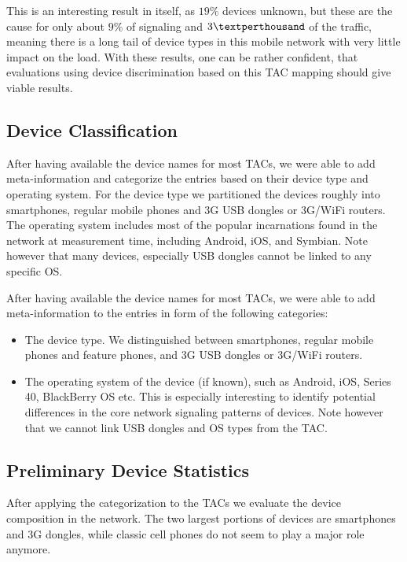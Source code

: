 This is an interesting result in itself, as $19\%$ devices unknown, but these are the cause for only about $9\%$ of signaling and $3\textperthousand$ of the traffic, meaning there is a long tail of device types in this mobile network with very little impact on the load. With these results, one can be rather confident, that evaluations using device discrimination based on this \gls{TAC} mapping should give viable results.


\subsection{Device Classification}

After having available the device names for most \glspl{TAC}, we were able to add meta-information and categorize the entries based on their device type and operating system. For the device type we partitioned the devices roughly into smartphones, regular mobile phones and 3G USB dongles or 3G/WiFi routers. The operating system includes most of the popular incarnations found in the network at measurement time, including Android, iOS, and Symbian. Note however that many devices, especially USB dongles cannot be linked to any specific OS.


After having available the device names for most \glspl{TAC}, we were able to add meta-information to the entries in form of the following categories:

\begin{itemize}
\item The device type. We distinguished between smartphones, regular mobile phones and feature phones, and 3G USB dongles or 3G/WiFi routers.

\item The operating system of the device (if known), such as Android, iOS, Series 40, BlackBerry OS etc. This is especially interesting to identify potential differences in the core network signaling patterns of devices. Note however that we cannot link USB dongles and OS types from the \gls{TAC}.

\end{itemize}



\subsection{Preliminary Device Statistics}
After applying the categorization to the \glspl{TAC} we evaluate the device composition in the network. The two largest portions of devices are smartphones  and 3G dongles, while classic cell phones do not seem to play a major role anymore. 

